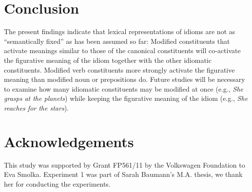 \documentclass[output=paper]{langsci/langscibook}
\begin{document}
\section{Conclusion}
The present findings indicate that lexical representations of idioms are not as ``semantically fixed'' as has been assumed so far: Modified constituents that activate meanings similar to those of the canonical constituents will co-activate the figurative meaning of the idiom together with the other idiomatic constituents. Modified verb constituents more strongly activate the figurative meaning than modified noun or prepositions do. Future studies will be necessary to examine how many idiomatic constituents may be modified at once (e.g., \textit{She grasps at the planets}) while keeping the figurative meaning of the idiom (e.g., \textit{She reaches for the stars}).

\section*{Acknowledgements}
This study was supported by Grant FP561/11 by the Volkswagen Foundation to Eva Smolka. Experiment 1 was part of Sarah Baumann's M.A. thesis, we thank her for conducting the experiments.


{\sloppy\printbibliography[heading=subbibliography]}
\end{document}
